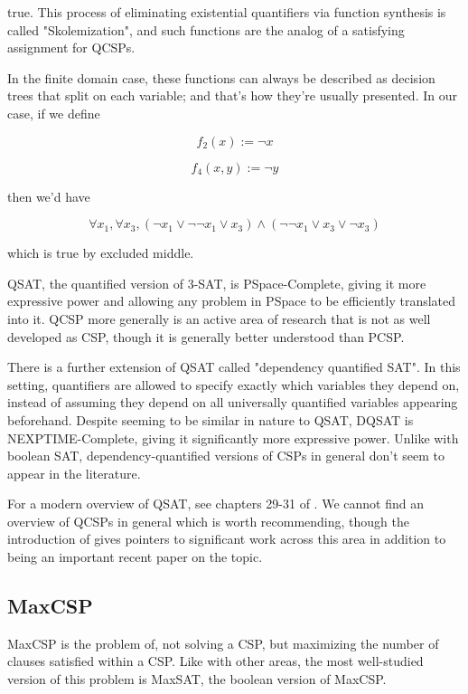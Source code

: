 true. This process of eliminating existential quantifiers via function synthesis is called "Skolemization", and such functions are the analog of a satisfying assignment for QCSPs.

In the finite domain case, these functions can always be described as decision trees that split on each variable; and that's how they're usually presented. In our case, if we define

\begin{equation}
    f_2(x) := \neg x
\end{equation}

\begin{equation}
    f_4(x, y) := \neg y
\end{equation}

then we'd have

\begin{equation}
    \forall x_1, \forall x_3, (\neg x_1 \vee \neg \neg x_1 \vee x_3) \wedge (\neg \neg x_1 \vee x_3 \vee \neg x_3)
\end{equation}

which is true by excluded middle.

QSAT, the quantified version of 3-SAT, is PSpace-Complete, giving it more expressive power and allowing any problem in PSpace to be efficiently translated into it. QCSP more generally is an active area of research that is not as well developed as CSP, though it is generally better understood than PCSP.

There is a further extension of QSAT called "dependency quantified SAT". In this setting, quantifiers are allowed to specify exactly which variables they depend on, instead of assuming they depend on all universally quantified variables appearing beforehand. Despite seeming to be similar in nature to QSAT, DQSAT is NEXPTIME-Complete, giving it significantly more expressive power. Unlike with boolean SAT, dependency-quantified versions of CSPs in general don't seem to appear in the literature.

For a modern overview of QSAT, see chapters 29-31 of \citep{biere2009handbook}. We cannot find an overview of QCSPs in general which is worth recommending, though the introduction of \citep{zhuk2023complete} gives pointers to significant work across this area in addition to being an important recent paper on the topic.


\subsection{MaxCSP}\label{sec:max-csp}
MaxCSP is the problem of, not solving a CSP, but maximizing the number of clauses satisfied within a CSP. Like with other areas, the most well-studied version of this problem is MaxSAT, the boolean version of MaxCSP.

